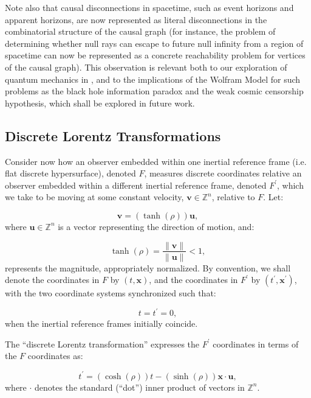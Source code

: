 \documentclass{article}
\begin{document}
Note also that causal disconnections in spacetime, such as event horizons and apparent horizons, are now represented as literal disconnections in the combinatorial structure of the causal graph (for instance, the problem of determining whether null rays can escape to future null infinity from a region of spacetime can now be represented as a concrete reachability problem for vertices of the causal graph). This observation is relevant both to our exploration of quantum mechanics in \cite{gorard_new}, and to the implications of the Wolfram Model for such problems as the black hole information paradox and the weak cosmic censorship hypothesis, which shall be explored in future work.

\subsection{Discrete Lorentz Transformations}
\label{sec:CurrentStatus4}

Consider now how an observer embedded within one inertial reference frame (i.e. flat discrete hypersurface), denoted $F$, measures discrete coordinates relative an observer embedded within a different inertial reference frame, denoted ${F^{\prime}}$, which we take to be moving at some constant velocity, ${\mathbf{v} \in \mathbb{Z}^n}$, relative to $F$. Let:

\begin{equation}
\mathbf{v} = \left( \tanh \left( \rho \right) \right) \mathbf{u},
\end{equation}
where ${\mathbf{u} \in \mathbb{Z}^n}$ is a vector representing the direction of motion, and:

\begin{equation}
\tanh \left( \rho \right) = \frac{\lVert \mathbf{v} \rVert}{\lVert \mathbf{u} \rVert} < 1,
\end{equation}
represents the magnitude, appropriately normalized. By convention, we shall denote the coordinates in $F$ by ${\left( t, \mathbf{x} \right)}$, and the coordinates in ${F^{\prime}}$ by ${\left( t^{\prime}, \mathbf{x}^{\prime} \right)}$, with the two coordinate systems synchronized such that:

\begin{equation}
t = t^{\prime} = 0,
\end{equation}
when the inertial reference frames initially coincide.

\begin{definition}
The ``discrete Lorentz transformation'' expresses the ${F^{\prime}}$ coordinates in terms of the $F$ coordinates as:

\begin{equation}
t^{\prime} = \left( \cosh \left( \rho \right) \right) t - \left( \sinh \left( \rho \right) \right) \mathbf{x} \cdot \mathbf{u},
\end{equation}
where ${\cdot}$ denotes the standard (``dot'') inner product of vectors in ${\mathbb{Z}^n}$.
\end{definition}
\end{document}
